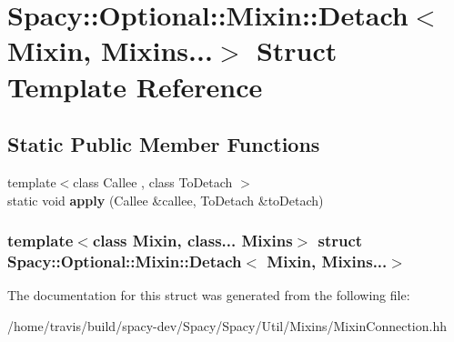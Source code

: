 \hypertarget{structSpacy_1_1Optional_1_1Mixin_1_1Detach_3_01Mixin_00_01Mixins_8_8_8_4}{\section{\-Spacy\-:\-:\-Optional\-:\-:\-Mixin\-:\-:\-Detach$<$ \-Mixin, \-Mixins...$>$ \-Struct \-Template \-Reference}
\label{structSpacy_1_1Optional_1_1Mixin_1_1Detach_3_01Mixin_00_01Mixins_8_8_8_4}
}
\subsection*{\-Static \-Public \-Member \-Functions}
\begin{DoxyCompactItemize}
\item 
\hypertarget{structSpacy_1_1Optional_1_1Mixin_1_1Detach_3_01Mixin_00_01Mixins_8_8_8_4_a4e59ecaaca0c46c39f3020f0b2c1dc91}{{\footnotesize template$<$class Callee , class To\-Detach $>$ }\\static void {\bfseries apply} (\-Callee \&callee, \-To\-Detach \&to\-Detach)}\label{structSpacy_1_1Optional_1_1Mixin_1_1Detach_3_01Mixin_00_01Mixins_8_8_8_4_a4e59ecaaca0c46c39f3020f0b2c1dc91}

\end{DoxyCompactItemize}
\subsubsection*{template$<$class Mixin, class... \-Mixins$>$ struct Spacy\-::\-Optional\-::\-Mixin\-::\-Detach$<$ Mixin, Mixins...$>$}



\-The documentation for this struct was generated from the following file\-:\begin{DoxyCompactItemize}
\item 
/home/travis/build/spacy-\/dev/\-Spacy/\-Spacy/\-Util/\-Mixins/\-Mixin\-Connection.\-hh\end{DoxyCompactItemize}
